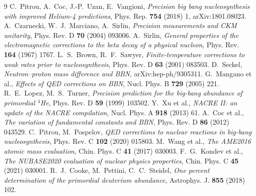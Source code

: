 \documentclass[11pt,a4paper]{article}
\begin{document}
\begin{thebibliography}{9}
  C.~Pitrou, A.~Coc, J.-P.~Uzan, E.~Vangioni,
  \emph{Precision big bang nucleosynthesis with improved Helium-4 predictions},
  Phys. Rep. \textbf{754} (2018) 1, arXiv:1801.08023.
  A.~Czarnecki, W.~J.~Marciano, A.~Sirlin,
  \emph{Precision measurements and CKM unitarity},
  Phys. Rev. D \textbf{70} (2004) 093006.
  A.~Sirlin, \emph{General properties of the electromagnetic corrections to the
  beta decay of a physical nucleon}, Phys. Rev. \textbf{164} (1967) 1767.
  L.~S.~Brown, R.~F.~Sawyer,
  \emph{Finite-temperature corrections to weak rates prior to nucleosynthesis},
  Phys. Rev. D \textbf{63} (2001) 083503.
  D.~Seckel, \emph{Neutron--proton mass difference and BBN}, arXiv:hep-ph/9305311.
  G.~Mangano et al., \emph{Effects of QED corrections on BBN},
  Nucl. Phys. B \textbf{729} (2005) 221.
  R.~E.~Lopez, M.~S.~Turner, \emph{Precision prediction for the big-bang
  abundance of primordial $^4$He}, Phys. Rev. D \textbf{59} (1999) 103502.
  Y.~Xu et al., \emph{NACRE II: an update of the NACRE compilation},
  Nucl. Phys. A \textbf{918} (2013) 61.
  A.~Coc et al., \emph{The variation of fundamental constants and BBN},
  Phys. Rev. D \textbf{86} (2012) 043529.
  C.~Pitrou, M.~Pospelov,
  \emph{QED corrections to nuclear reactions in big-bang nucleosynthesis},
  Phys. Rev. C \textbf{102} (2020) 015803.
  M.~Wang et al., \emph{The AME2016 atomic mass evaluation},
  Chin. Phys. C \textbf{41} (2017) 030003.
  F.~G.~Kondev et al., \emph{The NUBASE2020 evaluation of nuclear physics
  properties}, Chin. Phys. C \textbf{45} (2021) 030001.
  R.~J.~Cooke, M.~Pettini, C.~C.~Steidel,
  \emph{One percent determination of the primordial deuterium abundance},
  Astrophys. J. \textbf{855} (2018) 102.
\end{thebibliography}
\end{document}
